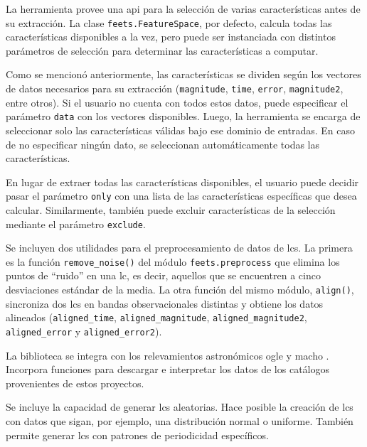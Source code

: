 \begin{description}[resume]
    \item[Selección flexible de características]
    La herramienta provee una \gls{api} para la selección de varias características antes de su extracción. La clase \texttt{feets.FeatureSpace}, por defecto, calcula todas las características disponibles a la vez, pero puede ser instanciada con distintos parámetros de selección para determinar las características a computar.

    Como se mencionó anteriormente, las características se dividen según los vectores de datos necesarios para su extracción (\texttt{magnitude}, \texttt{time}, \texttt{error}, \texttt{magnitude2}, entre otros). Si el usuario no cuenta con todos estos datos, puede especificar el parámetro \texttt{data} con los vectores disponibles. Luego, la herramienta se encarga de seleccionar solo las características válidas bajo ese dominio de entradas. En caso de no especificar ningún dato, se seleccionan automáticamente todas las características.

    En lugar de extraer todas las características disponibles, el usuario puede decidir pasar el parámetro \texttt{only} con una lista de las características específicas que desea calcular. Similarmente, también puede excluir características de la selección mediante el parámetro \texttt{exclude}.

    \item[Limpieza y preprocesamiento de datos]
    Se incluyen dos utilidades para el preprocesamiento de datos de \glspl{lc}.
    La primera es la función \texttt{remove\_noise()} del módulo \texttt{feets.preprocess} que elimina los puntos de ``ruido'' en una \gls{lc}, es decir, aquellos que se encuentren a cinco desviaciones estándar de la media.
    La otra función del mismo módulo, \texttt{align()}, sincroniza dos \glspl{lc} en bandas observacionales distintas y obtiene los datos alineados (\texttt{aligned\_time}, \texttt{aligned\_magnitude}, \texttt{aligned\_magnitude2}, \texttt{a\-ligned\_e\-rror} y \texttt{a\-ligned\_e\-rror2}).

    
    \item[Lector de catálogos astronómicos]
    La biblioteca se integra con los relevamientos astronómicos \gls{ogle} \citep{soszynski2013ogle} y \gls{macho} \citep{alcock2001macho}. Incorpora funciones para descargar e interpretar los datos de los catálogos provenientes de estos proyectos. 

    \item[Generación de curvas de luz]
    Se incluye la capacidad de generar \glspl{lc} aleatorias. Hace posible la creación de \glspl{lc} con datos que sigan, por ejemplo, una distribución normal o uniforme. También permite generar \glspl{lc} con patrones de periodicidad específicos.


\end{description}
